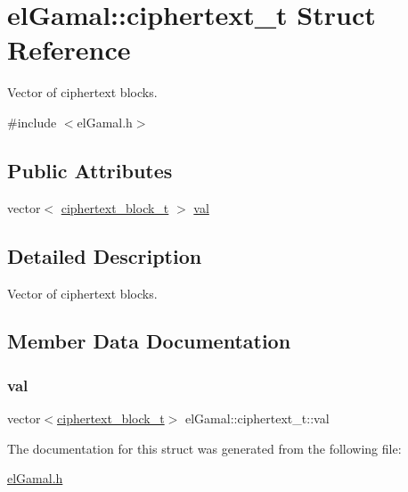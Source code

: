 \hypertarget{structelGamal_1_1ciphertext__t}{}\section{el\+Gamal\+:\+:ciphertext\+\_\+t Struct Reference}
\label{structelGamal_1_1ciphertext__t}


Vector of ciphertext blocks.  




{\ttfamily \#include $<$el\+Gamal.\+h$>$}

\subsection*{Public Attributes}
\begin{DoxyCompactItemize}
\item 
vector$<$ \mbox{\hyperlink{structelGamal_1_1ciphertext__block__t}{ciphertext\+\_\+block\+\_\+t}} $>$ \mbox{\hyperlink{structelGamal_1_1ciphertext__t_a3d23b4518b8c004ee97a8e5e41d0c868}{val}}
\end{DoxyCompactItemize}


\subsection{Detailed Description}
Vector of ciphertext blocks. 

\subsection{Member Data Documentation}
\mbox{\label{structelGamal_1_1ciphertext__t_a3d23b4518b8c004ee97a8e5e41d0c868}} 
\subsubsection{\texorpdfstring{val}{val}}
{\footnotesize\ttfamily vector$<$\mbox{\hyperlink{structelGamal_1_1ciphertext__block__t}{ciphertext\+\_\+block\+\_\+t}}$>$ el\+Gamal\+::ciphertext\+\_\+t\+::val}



The documentation for this struct was generated from the following file\+:\begin{DoxyCompactItemize}
\item 
\mbox{\hyperlink{elGamal_8h}{el\+Gamal.\+h}}\end{DoxyCompactItemize}
